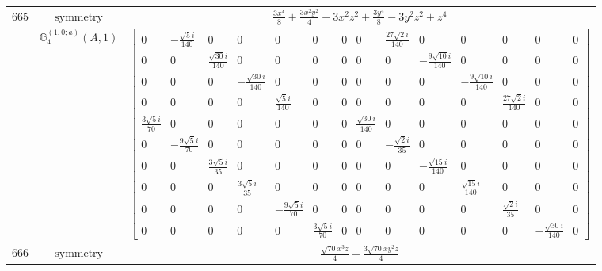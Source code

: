 \documentclass[fleqn,8pt,landscape]{jsarticle}
\begin{document}
\begin{longtable}{ccc}
$ 665 $ & $ \text{symmetry} $ & $ \frac{3 x^{4}}{8} + \frac{3 x^{2} y^{2}}{4} - 3 x^{2} z^{2} + \frac{3 y^{4}}{8} - 3 y^{2} z^{2} + z^{4} $ \\
$  $ & $ \mathbb{G}_{4}^{(1,0;a)}(A,1) $ & $ \begin{bmatrix} 0 & - \frac{\sqrt{5} i}{140} & 0 & 0 & 0 & 0 & 0 & 0 & \frac{27 \sqrt{2} i}{140} & 0 & 0 & 0 & 0 & 0 \\ 0 & 0 & \frac{\sqrt{30} i}{140} & 0 & 0 & 0 & 0 & 0 & 0 & - \frac{9 \sqrt{10} i}{140} & 0 & 0 & 0 & 0 \\ 0 & 0 & 0 & - \frac{\sqrt{30} i}{140} & 0 & 0 & 0 & 0 & 0 & 0 & - \frac{9 \sqrt{10} i}{140} & 0 & 0 & 0 \\ 0 & 0 & 0 & 0 & \frac{\sqrt{5} i}{140} & 0 & 0 & 0 & 0 & 0 & 0 & \frac{27 \sqrt{2} i}{140} & 0 & 0 \\ \frac{3 \sqrt{5} i}{70} & 0 & 0 & 0 & 0 & 0 & 0 & \frac{\sqrt{30} i}{140} & 0 & 0 & 0 & 0 & 0 & 0 \\ 0 & - \frac{9 \sqrt{5} i}{70} & 0 & 0 & 0 & 0 & 0 & 0 & - \frac{\sqrt{2} i}{35} & 0 & 0 & 0 & 0 & 0 \\ 0 & 0 & \frac{3 \sqrt{5} i}{35} & 0 & 0 & 0 & 0 & 0 & 0 & - \frac{\sqrt{15} i}{140} & 0 & 0 & 0 & 0 \\ 0 & 0 & 0 & \frac{3 \sqrt{5} i}{35} & 0 & 0 & 0 & 0 & 0 & 0 & \frac{\sqrt{15} i}{140} & 0 & 0 & 0 \\ 0 & 0 & 0 & 0 & - \frac{9 \sqrt{5} i}{70} & 0 & 0 & 0 & 0 & 0 & 0 & \frac{\sqrt{2} i}{35} & 0 & 0 \\ 0 & 0 & 0 & 0 & 0 & \frac{3 \sqrt{5} i}{70} & 0 & 0 & 0 & 0 & 0 & 0 & - \frac{\sqrt{30} i}{140} & 0 \end{bmatrix} $ \\ \hline
$ 666 $ & $ \text{symmetry} $ & $ \frac{\sqrt{70} x^{3} z}{4} - \frac{3 \sqrt{70} x y^{2} z}{4} $ \\

\end{longtable}
\end{document}

